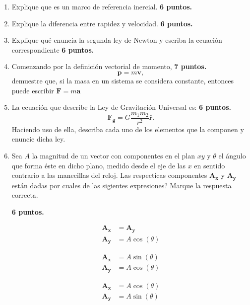 \documentclass[]{article}
\begin{document}
\begin{enumerate}
\item Explique que es un marco de referencia inercial.
\hfill \textbf{6 puntos.}

\item Explique la diferencia entre rapidez y velocidad.
\hfill \textbf{6 puntos.}

\item Explique qu\'e enuncia la segunda ley de Newton y escriba la ecuaci\'on
correspondiente
\hfill \textbf{6 puntos.}

\item Comenzando por la definici\'on vectorial de momento, 
\hfill \textbf{7 puntos.}
\begin{equation*}
\boldsymbol{p} = m \boldsymbol{v},
\end{equation*}
demuestre que, si la masa en un sistema se considera constante, entonces
puede escribir $\boldsymbol{F} = m \boldsymbol{a}$

\item La ecuaci\'on que describe la Ley de Gravitaci\'on Universal es:
\hfill \textbf{6 puntos.}
\begin{equation*}
\boldsymbol{F_{g}} = G \frac{m_{1}m_{2}}{r^{2}}\boldsymbol{\hat{r}}.
\end{equation*}
Haciendo uso de ella, describa cada uno de los elementos que la componen y
enuncie dicha ley.

\item Sea $A$ la magnitud de un vector con componentes en el plan $xy$ y
$\theta$ el \'angulo que forma \'este en dicho plano, medido desde el eje de
las $x$ en sentido contrario a las manecillas del reloj. Las respecticas
componentes $\boldsymbol{A_{x}}$ y $\boldsymbol{A_{y}}$ est\'an dadas por
cuales de las sigientes expresiones? Marque la respuesta correcta.

\hfill \textbf{6 puntos.}
\vspace{-10mm}
\begin{multicols}{4}
\begin{align*}
\boldsymbol{A_{x}} &= \boldsymbol{A_{y}} \\
\boldsymbol{A_{y}} &= A\cos(\theta)
\end{align*}

\begin{align*}
\boldsymbol{A_{x}} &= A\sin(\theta) \\
\boldsymbol{A_{y}} &= A\cos(\theta)
\end{align*}

\begin{align*}
\boldsymbol{A_{x}} &= A\cos(\theta) \\
\boldsymbol{A_{y}} &= A\sin(\theta)
\end{align*}


\end{multicols}
\end{enumerate}
\end{document}
